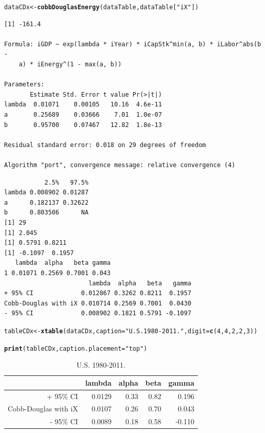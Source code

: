 \documentclass[preprint,authoryear,12pt]{elsarticle}\usepackage{graphicx, color}
\makeatletter
\newcommand{\hlfunctioncall}[1]{\textcolor[rgb]{0.501960784313725,0,0.329411764705882}{\textbf{#1}}}%
\newcommand{\hlstring}[1]{\textcolor[rgb]{0.6,0.6,1}{#1}}%
\newenvironment{kframe}{%
 \def\at@end@of@kframe{}%
 \ifinner\ifhmode%
  \def\at@end@of@kframe{\end{minipage}}%
  \begin{minipage}{\columnwidth}%
 \fi\fi%
 \def\FrameCommand##1{\hskip\@totalleftmargin \hskip-\fboxsep
 \colorbox{shadecolor}{##1}\hskip-\fboxsep
     \hskip-\linewidth \hskip-\@totalleftmargin \hskip\columnwidth}%
 \MakeFramed {\advance\hsize-\width
   \@totalleftmargin\z@ \linewidth\hsize
   \@setminipage}}%
 {\par\unskip\endMakeFramed%
 \at@end@of@kframe}
\newenvironment{knitrout}{}{} %
\makeatother
\begin{document}
\begin{knitrout}
\color{fgcolor}\begin{kframe}
\begin{alltt}
dataCDx <- \hlfunctioncall{cobbDouglasEnergy}(dataTable, dataTable[\hlstring{"iX"}])
\end{alltt}
\begin{verbatim}
[1] -161.4

Formula: iGDP ~ exp(lambda * iYear) * iCapStk^min(a, b) * iLabor^abs(b - 
    a) * iEnergy^(1 - max(a, b))

Parameters:
       Estimate Std. Error t value Pr(>|t|)
lambda  0.01071    0.00105   10.16  4.6e-11
a       0.25689    0.03666    7.01  1.0e-07
b       0.95700    0.07467   12.82  1.8e-13

Residual standard error: 0.018 on 29 degrees of freedom

Algorithm "port", convergence message: relative convergence (4) 
\end{verbatim}


{\ttfamily\noindent\itshape\color{messagecolor}{Waiting for profiling to be done...}}\begin{verbatim}
           2.5%   97.5%
lambda 0.008902 0.01287
a      0.182137 0.32622
b      0.803506      NA
[1] 29
[1] 2.045
[1] 0.5791 0.8211
[1] -0.1097  0.1957
   lambda  alpha   beta gamma
1 0.01071 0.2569 0.7001 0.043
                       lambda  alpha   beta   gamma
+ 95% CI             0.012867 0.3262 0.8211  0.1957
Cobb-Douglas with iX 0.010714 0.2569 0.7001  0.0430
- 95% CI             0.008902 0.1821 0.5791 -0.1097
\end{verbatim}
\begin{alltt}
tableCDx <- \hlfunctioncall{xtable}(dataCDx, caption=\hlstring{"U.S. 1980-2011."}, digit = \hlfunctioncall{c}(4, 4, 2, 2, 3))
\end{alltt}
\end{kframe}
\end{knitrout}


\begin{kframe}
\begin{alltt}
\hlfunctioncall{print}(tableCDx, caption.placement=\hlstring{"top"})
\end{alltt}
\end{kframe}%
\begin{table}[ht]
\begin{center}
\caption{U.S. 1980-2011.}
\begin{tabular}{rrrrr}
  \hline
 & lambda & alpha & beta & gamma \\ 
  \hline
+ 95\% CI & 0.0129 & 0.33 & 0.82 & 0.196 \\ 
  Cobb-Douglas with iX & 0.0107 & 0.26 & 0.70 & 0.043 \\ 
  - 95\% CI & 0.0089 & 0.18 & 0.58 & -0.110 \\ 
   \hline
\end{tabular}
\end{center}
\end{table}
\end{document}

